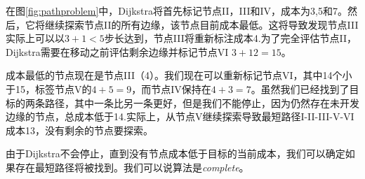 
在图\ref{fig:pathproblem}中，Dijkstra将首先标记节点II，III和IV，成本为3,5和7。然后，它将继续探索节点II的所有边缘，该节点目前成本最低。这将导致发现节点III实际上可以以$ 3 + 1 <5 $步长达到，节点III将重新标注成本4.为了完全评估节点II，Dijkstra需要在移动之前评估剩余边缘并标记节点VI $ 3 + 12 = 15 $。


成本最低的节点现在是节点III（4）。我们现在可以重新标记节点VI，其中14个小于15，标签节点V的$ 4 + 5 = 9 $，而节点IV保持在$ 4 + 3 = 7 $。虽然我们已经找到了目标的两条路径，其中一条比另一条更好，但是我们不能停止，因为仍然存在未开发边缘的节点，总成本低于14.实际上，从节点V继续探索导致最短路径I-II-III-V-VI成本13，没有剩余的节点要探索。


由于Dijkstra不会停止，直到没有节点成本低于目标的当前成本，我们可以确定如果存在最短路径将被找到。我们可以说算法是\emph {complete}。


